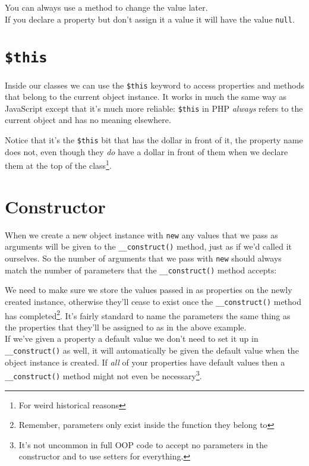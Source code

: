 
You can always use a method to change the value later.
\\

If you declare a property but don't assign it a value it will have the value \texttt{null}.


\section{\texttt{\$this}}

Inside our classes we can use the \texttt{\$this} keyword to access properties and methods that belong to the current object instance. It works in much the same way as JavaScript except that it's much more reliable: \texttt{\$this} in PHP \textit{always} refers to the current object and has no meaning elsewhere.


Notice that it's the \texttt{\$this} bit that has the dollar in front of it, the property name does not, even though they \textit{do} have a dollar in front of them when we declare them at the top of the class\footnote{For weird historical reasons}.

\section{Constructor}

When we create a new object instance with \texttt{new} any values that we pass as arguments will be given to the \texttt{\_\_construct()} method, just as if we'd called it ourselves. So the number of arguments that we pass with \texttt{new} should always match the number of parameters that the \texttt{\_\_construct()} method accepts:


We need to make sure we store the values passed in as properties on the newly created instance, otherwise they'll cease to exist once the \texttt{\_\_construct()} method has completed\footnote{Remember, parameters only exist inside the function they belong to}. It's fairly standard to name the parameters the same thing as the properties that they'll be assigned to as in the above example.
\\

If we've given a property a default value we don't need to set it up in \texttt{\_\_construct()} as well, it will automatically be given the default value when the object instance is created. If \textit{all} of your properties have default values then a \texttt{\_\_construct()} method might not even be necessary\footnote{It's not uncommon in full OOP code to accept no parameters in the constructor and to use setters for everything.}.


